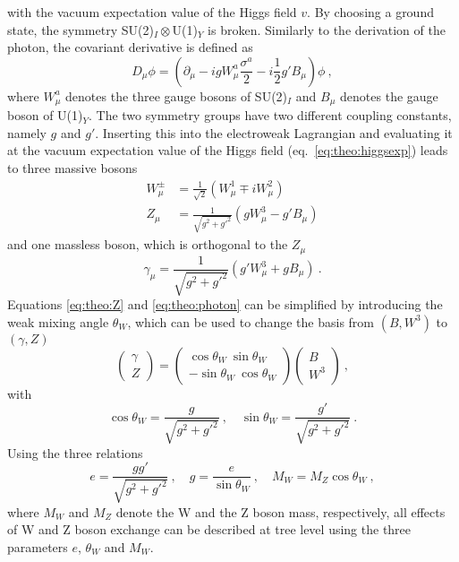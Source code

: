 with the vacuum expectation value of the Higgs field $v$. By choosing a ground state, the symmetry SU(2)$_I\otimes$U(1)$_Y$ is broken. Similarly to the derivation of the photon, the covariant derivative is defined as
\begin{equation}
D_\mu \phi = \left( \partial_\mu -igW_\mu^a\frac{\sigma^a}{2} - i\frac{1}{2}g'B_\mu \right)\phi ~,
\end{equation}
where $W_\mu^a$ denotes the three gauge bosons of SU(2)$_I$ and $B_\mu$ denotes the gauge boson of U(1)$_Y$. The two symmetry groups have two different coupling constants, namely $g$ and $g'$. Inserting this into the electroweak Lagrangian and evaluating it at the vacuum expectation value of the Higgs field (eq.~\ref{eq:theo:higgsexp}) leads to three massive bosons
\begin{align}
W_\mu^\pm &= \frac{1}{\sqrt{2}}\left( W_\mu^1 \mp iW_\mu^2 \right) \\
Z_\mu &= \frac{1}{\sqrt{g^2+g'^2}}\left( gW_\mu^3-g'B_\mu\right) \label{eq:theo:Z}
\end{align}
and one massless boson, which is orthogonal to the $Z_\mu$
\begin{equation}
\gamma_\mu = \frac{1}{\sqrt{g^2+g'^2}}\left( g'W_\mu^3 + gB_\mu \right) ~. \label{eq:theo:photon}
\end{equation}
Equations \ref{eq:theo:Z} and \ref{eq:theo:photon} can be simplified by introducing the weak mixing angle $\theta_W$, which can be used to change the basis from $(B,W^3)$ to $(\gamma,Z)$
\begin{equation}
\left( \begin{array}{c} \gamma \\ Z \end{array} \right) = \left( \begin{array}{c} \cos \theta_W ~  \sin \theta_W \\ -\sin \theta_W ~  \cos \theta_W \end{array} \right) \left( \begin{array}{c} B \\ W^3 \end{array} \right) ~,
\end{equation}
with 
\begin{equation}
\cos \theta_W = \frac{g}{\sqrt{g^2+g'^2}} ~, \quad \sin \theta_W = \frac{g'}{\sqrt{g^2+g'^2}} ~.
\end{equation}
Using the three relations
\begin{equation}
e=\frac{gg'}{\sqrt{g^2+g'^2}} ~, \quad g=\frac{e}{\sin \theta_W} ~, \quad M_W=M_Z \cos \theta_W ~,
\end{equation}
where $M_W$ and $M_Z$ denote the W and the Z boson mass, respectively, all effects of W and Z boson exchange can be described at tree level using the three parameters $e$, $\theta_W$ and $M_W$.\\

